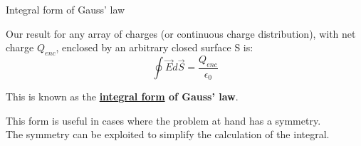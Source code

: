 %
%
%

\begin{frame}{Integral form of Gauss' law}

Our result for any array of charges (or continuous charge distribution), with net charge $Q_{enc}$,
enclosed by an arbitrary closed surface S is:
\begin{equation*}
  \oint \vec{E} d\vec{S} = \frac{Q_{enc}}{\epsilon_0}
\end{equation*}

This is known as the {\bf \underline{integral form} of Gauss' law}.\\
\vspace{0.2cm}

This form is useful in cases where the problem at hand has a symmetry.\\
The symmetry can be exploited to simplify the calculation of the integral.\\

\end{frame}



%
%

